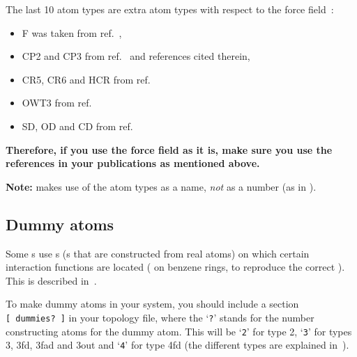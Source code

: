 The last 10 atom types are extra atom types with respect to the 
force field~\cite{biomos}: 
\begin{itemize}
\item F was taken from ref.~\cite{Buuren93a}, 
\item CP2 and CP3 from ref.~\cite{Buuren93b} and references cited therein, 
\item CR5, CR6 and HCR from ref.~\cite{King93}
\item OWT3 from ref.~\cite{Jorgensen83}
\item SD, OD and CD from ref.~\cite{Liu95}
\end{itemize}
{\bf Therefore, if you use the {\gromacs} force field as it is, make
sure you use the references in your publications as mentioned above.}

{\bf Note:} {\gromacs} makes use of the atom types as a name, {\em
not} as a number (as {\eg} in {\gromos}).

%
%

\subsection{Dummy atoms}
\label{sec:dummytop}
Some s use s 
(s that are constructed
from real atoms) on which certain interaction functions are located
({\eg} on benzene rings, to reproduce the correct
). This is described in~.

To make dummy atoms in your system, you should include a section
{\tt [~dummies?~]} in your topology file, where the `{\tt ?}' stands
for the number constructing atoms for the dummy atom. This will be
`{\tt 2}' for type 2, `{\tt 3}' for types 3, 3fd, 3fad and 3out and
`{\tt 4}' for type 4fd (the different types are explained
in~).

